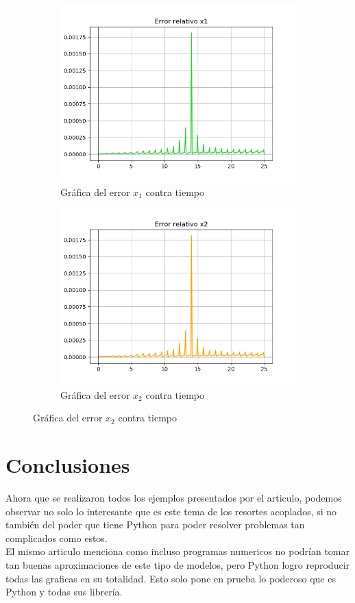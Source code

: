 \documentclass[12pt]{article}
\begin{document}
\begin{figure}[h!]
\begin{subfigure}{.6\textwidth}
  \centering
  \includegraphics[width=.6\linewidth]{Ej2_23.png}
  \caption{Gráfica del error $x_1$ contra tiempo}
  \label{fig:sfig2}
\end{subfigure}
\begin{subfigure}{.6\textwidth}
  \centering
  \includegraphics[width=.6\linewidth]{Ej2_24.png}
  \caption{Gráfica del error $x_2$ contra tiempo}
  \label{fig:sfig2}
\end{subfigure}
\end{figure}

\section{Conclusiones}
Ahora que se realizaron todos los ejemplos presentados por el articulo, podemos observar no solo lo interesante que es este tema de los resortes acoplados, si no también del poder que tiene Python para poder resolver problemas tan complicados como estos. \\

El mismo articulo menciona como incluso programas numericos no podrían tomar tan buenas aproximaciones de este tipo de modelos, pero Python logro reproducir todas las graficas en su totalidad. Esto solo pone en prueba lo poderoso que es Python y todas sus librería. 
\end{document}

